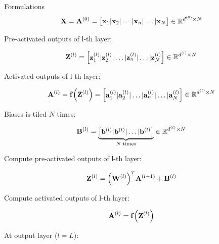 \documentclass[10pt]{beamer}
\theoremstyle{remark}
\theoremstyle{definition}
\begin{document}
\begin{frame}[allowframebreaks]{Formulations}
	\begin{equation}
		\bold{X}=\bold{A}^{(0)}=\begin{bmatrix} \bold{x}_1 \vert \bold{x}_2 \vert \dots \vert \bold{x}_n \vert \dots \vert  \bold{x}_N \end{bmatrix} \in \mathbb{R}^{d^{(0)} \times N}
	\end{equation}

	Pre-activated outputs of l-th layer:

	\begin{equation}
		\bold{Z}^{(l)}=\begin{bmatrix} \bold{z}_1^{(l)} \vert \bold{z}_2^{(l)} \vert \dots \vert \bold{z}_n^{(l)} \vert \dots \vert \bold{z}_N^{(l)} \end{bmatrix} \in \mathbb{R}^{d^{(l)} \times N}
	\end{equation}

	Activated outputs of l-th layer:

	\begin{equation}
		\bold{A}^{(l)}=\bold{f}\Big(\bold{Z}^{(l)}\Big)=\begin{bmatrix} \bold{a}_1^{(l)} \vert \bold{a}_2^{(l)} \vert \dots \vert \bold{a}_n^{(l)} \vert \dots \vert \bold{a}_N^{(l)} \end{bmatrix} \in \mathbb{R}^{d^{(l)} \times N}
	\end{equation}

	Biases is tiled $N$ times:

	\begin{equation}
		\bold{B}^{(l)}=\underbrace{\begin{bmatrix} \bold{b}^{(l)} \vert \bold{b}^{(l)} \vert \dots \vert \bold{b}^{(l)} \end{bmatrix}}_{N\text{ times}} \in \mathbb{R}^{d^{(l)} \times N}
	\end{equation}

	Compute pre-activated outputs of l-th layer:

	\begin{equation}
		\bold{Z}^{(l)}=\Big(\bold{W}^{(l)}\Big)^T\bold{A}^{(l-1)} + \bold{B}^{(l)}
	\end{equation}

	Compute activated outputs of l-th layer:

	\begin{equation}
		\bold{A}^{(l)} = \bold{f} \Big( \bold{Z}^{(l)} \Big)
	\end{equation}

	At output layer ($l=L$):


\end{frame}
\end{document}

